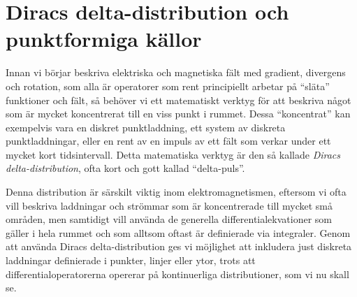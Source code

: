 \section{Diracs delta-distribution och punktformiga k{\"a}llor}
Innan vi b{\"o}rjar beskriva elektriska och magnetiska f{\"a}lt med gradient,
divergens och rotation, som alla {\"a}r operatorer som rent principiellt
arbetar p{\aa} ``sl{\"a}ta'' funktioner och f{\"a}lt, s{\aa} beh{\"o}ver vi
ett matematiskt verktyg f{\"o}r att beskriva n{\aa}got som {\"a}r mycket
koncentrerat till en viss punkt i rummet. Dessa ``koncentrat'' kan exempelvis
vara en diskret punktladdning,
ett system av diskreta punktladdningar, eller en rent av en impuls av ett
f{\"a}lt som verkar under ett mycket kort tidsintervall. Detta matematiska
verktyg {\"a}r den s{\aa} kallade {\it Diracs delta-distribution}, ofta kort och
gott kallad ``delta-puls''.

Denna distribution {\"a}r s{\"a}rskilt viktig inom elektromagnetismen, eftersom
vi ofta vill beskriva laddningar och str{\"o}mmar som {\"a}r koncentrerade till
mycket sm{\aa} omr{\aa}den, men samtidigt vill anv{\"a}nda de generella
differentialekvationer som g{\"a}ller i hela rummet och som alltsom oftast
{\"a}r definierade via integraler.
Genom att anv{\"a}nda Diracs delta-distribution ges vi m{\"o}jlighet att
inkludera just diskreta laddningar definierade i punkter, linjer eller ytor,
trots att differentialoperatorerna opererar p{\aa} kontinuerliga
distributioner, som vi nu skall se.
\vfill\eject

